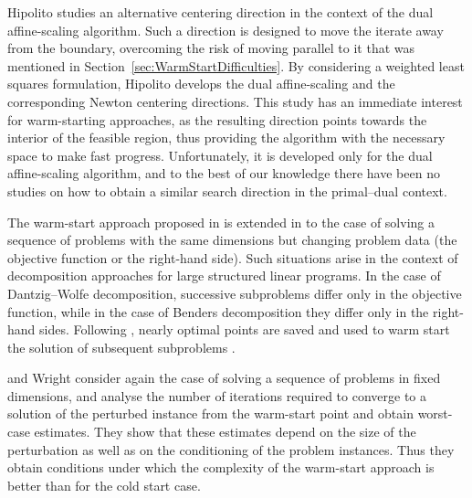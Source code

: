 Hipolito \cite{Hipolito} studies an alternative centering direction 
in the context of the dual affine-scaling algorithm. Such a 
direction is designed to move the iterate away from the boundary, 
overcoming the risk of moving parallel to it that was mentioned 
in Section~\ref{sec:WarmStartDifficulties}. 
By considering a weighted least squares formulation, Hipolito 
develops the dual affine-scaling and the corresponding Newton 
centering directions. 
This study has an immediate interest for warm-starting approaches,
as the resulting direction points towards the interior of the 
feasible region, thus providing the algorithm with the necessary 
space to make fast progress. 
Unfortunately, it is developed only for the dual affine-scaling 
algorithm, and to the best of our knowledge there have been no 
studies on how to obtain a similar search direction in the 
primal--dual context.

The warm-start approach proposed in \cite{Gondzio98} is extended
in \cite{GondzioVial} to the case of solving a sequence of problems 
with the same dimensions but changing problem data (the objective 
function or the right-hand side). Such situations arise 
in the context of decomposition approaches for large structured 
linear programs. 
In the case of Dantzig--Wolfe decomposition, successive subproblems 
differ only in the objective function, while in the case 
of Benders decomposition they differ only in the right-hand sides.
Following \cite{Gondzio98}, nearly optimal points are saved and used 
to warm start the solution of subsequent subproblems \cite{GondzioVial}.


\yildirim and Wright \cite{YildirimWright} consider again the case 
of solving a sequence of problems in fixed dimensions, and
analyse the number of iterations required to converge to a 
solution of the perturbed instance from the warm-start point and 
obtain worst-case estimates.
They show that these estimates depend on the size of the perturbation 
as well as on the conditioning %
of the problem 
instances. Thus they obtain conditions under which the complexity 
of the warm-start approach is better than for the cold start case.

